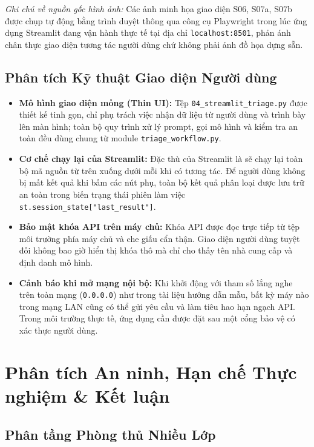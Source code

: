 \documentclass[11pt,a4paper]{article}
\begin{document}
\textit{Ghi chú về nguồn gốc hình ảnh:} Các ảnh minh họa giao diện S06, S07a, S07b được chụp tự động bằng trình duyệt thông qua công cụ Playwright trong lúc ứng dụng Streamlit đang vận hành thực tế tại địa chỉ \texttt{localhost:8501}, phản ánh chân thực giao diện tương tác người dùng chứ không phải ảnh đồ họa dựng sẵn.

\subsection{Phân tích Kỹ thuật Giao diện Người dùng}

\begin{itemize}
  \item \textbf{Mô hình giao diện mỏng (Thin UI):} Tệp \texttt{04\_streamlit\_triage.py} được thiết kế tinh gọn, chỉ phụ trách việc nhận dữ liệu từ người dùng và trình bày lên màn hình; toàn bộ quy trình xử lý prompt, gọi mô hình và kiểm tra an toàn đều dùng chung từ module \texttt{triage\_workflow.py}.
  \item \textbf{Cơ chế chạy lại của Streamlit:} Đặc thù của Streamlit là sẽ chạy lại toàn bộ mã nguồn từ trên xuống dưới mỗi khi có tương tác. Để người dùng không bị mất kết quả khi bấm các nút phụ, toàn bộ kết quả phân loại được lưu trữ an toàn trong biến trạng thái phiên làm việc \texttt{st.session\_state["last\_result"]}.
  \item \textbf{Bảo mật khóa API trên máy chủ:} Khóa API được đọc trực tiếp từ tệp môi trường phía máy chủ và che giấu cẩn thận. Giao diện người dùng tuyệt đối không bao giờ hiển thị khóa thô mà chỉ cho thấy tên nhà cung cấp và định danh mô hình.
  \item \textbf{Cảnh báo khi mở mạng nội bộ:} Khi khởi động với tham số lắng nghe trên toàn mạng (\texttt{0.0.0.0}) như trong tài liệu hướng dẫn mẫu, bất kỳ máy nào trong mạng LAN cũng có thể gửi yêu cầu và làm tiêu hao hạn ngạch API. Trong môi trường thực tế, ứng dụng cần được đặt sau một cổng bảo vệ có xác thực người dùng.
\end{itemize}

\section{Phân tích An ninh, Hạn chế Thực nghiệm \& Kết luận}

\subsection{Phân tầng Phòng thủ Nhiều Lớp}
\end{document}

